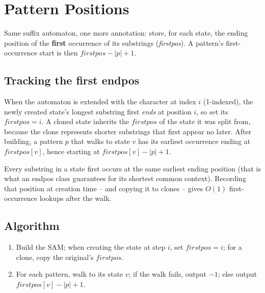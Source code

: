 \section{Pattern Positions}
\label{sec:cses-pattern-positions}


\begin{patternbox}
Same suffix automaton, one more annotation: store, for each state, the
ending position of the \textbf{first} occurrence of its substrings
(\textit{firstpos}). A pattern's first-occurrence start is then
$\textit{firstpos}-\lvert p\rvert+1$.
\end{patternbox}

\subsection*{Tracking the first endpos}

When the automaton is extended with the character at index $i$ (1-indexed),
the newly created state's longest substring first \emph{ends} at position
$i$, so set its $\textit{firstpos}=i$. A cloned state inherits the
$\textit{firstpos}$ of the state it was split from, because the clone
represents shorter substrings that first appear no later. After building,
a pattern $p$ that walks to state $v$ has its earliest occurrence ending at
$\textit{firstpos}[v]$, hence starting at
$\textit{firstpos}[v]-\lvert p\rvert+1$.

\begin{ideabox}
Every substring in a state first occurs at the same earliest ending
position (that is what an endpos class guarantees for its shortest common
context). Recording that position at creation time -- and copying it to
clones -- gives $O(1)$ first-occurrence lookups after the walk.
\end{ideabox}

\subsection*{Algorithm}

\begin{enumerate}
  \item Build the SAM; when creating the state at step $i$, set
        $\textit{firstpos}=i$; for a clone, copy the original's
        $\textit{firstpos}$.
  \item For each pattern, walk to its state $v$; if the walk fails, output
        $-1$; else output $\textit{firstpos}[v]-\lvert p\rvert+1$.
\end{enumerate}

